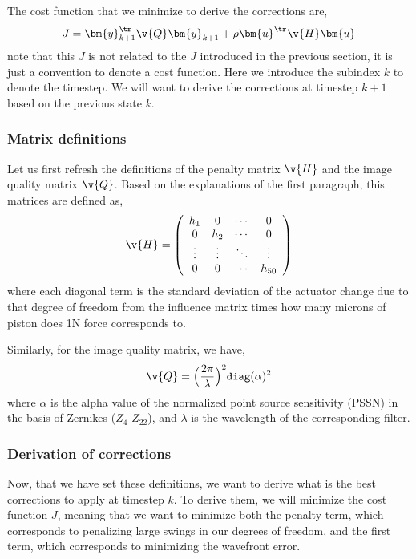 \documentclass[SE,authoryear,toc]{lsstdoc}
\begin{document}
The cost function that we minimize to derive the corrections are, 
\begin{equation}
    J = \bm{y}_{k+1}^{\tr}\v{Q}\bm{y}_{k+1} + \rho \bm{u}^{\tr}\v{H}\bm{u}
\end{equation}
note that this $J$ is not related to the $J$ introduced in the previous section, it is just a convention to denote a cost function. Here we introduce the subindex $k$ to denote the timestep. We will want to derive the corrections at timestep $k+1$ based on the previous state $k$.

\subsubsection*{Matrix definitions}
Let us first refresh the definitions of the penalty matrix $\v{H}$ and the image quality matrix $\v{Q}$. Based on the explanations of the first paragraph, this matrices are defined as, 
\begin{equation}
    \v{H} = \left(
  \begin{array}{cccc}
    h_1 &   0     & \cdots & 0 \\
    0 &   h_2     & \cdots & 0 \\
    \vdots &   \vdots    & \ddots & \vdots \\
    0 &   0     & \cdots & h_{50}  \\
  \end{array}
\right)
\end{equation}
where each diagonal term is the standard deviation of the actuator change due to that degree of freedom from the influence matrix times how many microns of piston does 1N force corresponds to.

Similarly, for the image quality matrix, we have,
\begin{equation}
    \v{Q} = \Big(\frac{2\pi}{\lambda}\Big) ^2 \texttt{diag}(\alpha)^2
\end{equation}
where $\alpha$ is the alpha value of the normalized point source sensitivity (PSSN) in the basis of Zernikes ($Z_4$-$Z_{22}$), and $\lambda$ is the wavelength of the corresponding filter.

\subsubsection*{Derivation of corrections}
Now, that we have set these definitions, we want to derive what is the best corrections to apply at timestep $k$. To derive them, we will minimize the cost function $J$, meaning that we want to minimize both the penalty term, which corresponds to penalizing large swings in our degrees of freedom, and the first term, which corresponds to minimizing the wavefront error.
\end{document}
